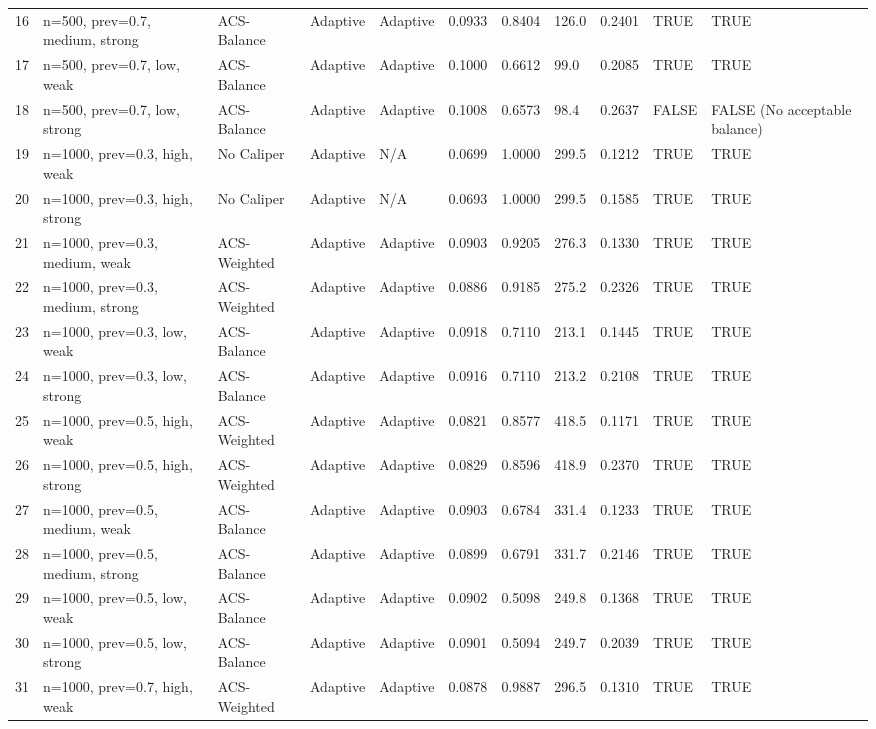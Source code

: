 \begin{tabular}{rllllllllll}
16 & n=500, prev=0.7, medium, strong & ACS-Balance & Adaptive & Adaptive & 0.0933 & 0.8404 & 126.0 & 0.2401 & TRUE & TRUE \\
17 & n=500, prev=0.7, low, weak & ACS-Balance & Adaptive & Adaptive & 0.1000 & 0.6612 & 99.0 & 0.2085 & TRUE & TRUE \\
18 & n=500, prev=0.7, low, strong & ACS-Balance & Adaptive & Adaptive & 0.1008 & 0.6573 & 98.4 & 0.2637 & FALSE & FALSE (No acceptable balance) \\
19 & n=1000, prev=0.3, high, weak & No Caliper & Adaptive & N/A & 0.0699 & 1.0000 & 299.5 & 0.1212 & TRUE & TRUE \\
20 & n=1000, prev=0.3, high, strong & No Caliper & Adaptive & N/A & 0.0693 & 1.0000 & 299.5 & 0.1585 & TRUE & TRUE \\
21 & n=1000, prev=0.3, medium, weak & ACS-Weighted & Adaptive & Adaptive & 0.0903 & 0.9205 & 276.3 & 0.1330 & TRUE & TRUE \\
22 & n=1000, prev=0.3, medium, strong & ACS-Weighted & Adaptive & Adaptive & 0.0886 & 0.9185 & 275.2 & 0.2326 & TRUE & TRUE \\
23 & n=1000, prev=0.3, low, weak & ACS-Balance & Adaptive & Adaptive & 0.0918 & 0.7110 & 213.1 & 0.1445 & TRUE & TRUE \\
24 & n=1000, prev=0.3, low, strong & ACS-Balance & Adaptive & Adaptive & 0.0916 & 0.7110 & 213.2 & 0.2108 & TRUE & TRUE \\
25 & n=1000, prev=0.5, high, weak & ACS-Weighted & Adaptive & Adaptive & 0.0821 & 0.8577 & 418.5 & 0.1171 & TRUE & TRUE \\
26 & n=1000, prev=0.5, high, strong & ACS-Weighted & Adaptive & Adaptive & 0.0829 & 0.8596 & 418.9 & 0.2370 & TRUE & TRUE \\
27 & n=1000, prev=0.5, medium, weak & ACS-Balance & Adaptive & Adaptive & 0.0903 & 0.6784 & 331.4 & 0.1233 & TRUE & TRUE \\
28 & n=1000, prev=0.5, medium, strong & ACS-Balance & Adaptive & Adaptive & 0.0899 & 0.6791 & 331.7 & 0.2146 & TRUE & TRUE \\
29 & n=1000, prev=0.5, low, weak & ACS-Balance & Adaptive & Adaptive & 0.0902 & 0.5098 & 249.8 & 0.1368 & TRUE & TRUE \\
30 & n=1000, prev=0.5, low, strong & ACS-Balance & Adaptive & Adaptive & 0.0901 & 0.5094 & 249.7 & 0.2039 & TRUE & TRUE \\
31 & n=1000, prev=0.7, high, weak & ACS-Weighted & Adaptive & Adaptive & 0.0878 & 0.9887 & 296.5 & 0.1310 & TRUE & TRUE \\

\end{tabular}
